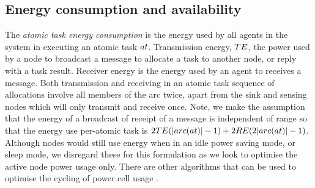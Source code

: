 \subsection{Energy consumption and availability}
The \textit{atomic task energy consumption} is the energy used by all agents in the system in executing an atomic task $\varAtomicTask{}{}$. Transmission energy, $TE$, the power used by a node to  broadcast a message to allocate a task to another node, or reply with a task result. Receiver energy is the energy used by an agent to receives a message. Both transmission and receiving in an atomic task sequence of allocations involve all members of the arc twice, apart from the sink and sensing nodes which will only transmit and receive once. Note, we make the assumption that the energy of a broadcast of receipt of a message is independent of range so that the energy use per-atomic task is 
$2\varTransmissionEnergy{}{} (\funcSize{\functionTaskArc{}{}}{} - 1)
	+ 2\varReceiverEnergy{}{} (2 \funcSize{\functionTaskArc{}{}}{} - 1)
$. Although nodes would still use energy when in an idle power saving mode, or sleep mode, we disregard these for this formulation as we look to optimise the active node power usage only. There are other algorithms that can be used to optimise the cycling of power cell usage \cite{DUMMY}.

\newcommand{\formalAgentEnergyAvailable}[2]{
	\functionFormal{fae}
	{\setAgents{}{}}
	{\setRealNumbersUnit{}{}}
}
\newcommand{\functionAgentEnergyAvailable}[2]{
	\functionSignature{fae_{\varTime{}{}}}
	{\varAgent{}{}}
}
\newcommand{\functionEnergyVariability}[2]{
	\ifx \\#1\\
	\functionSignature{rev_{\varTime{}{}}}
	{\setAgents{}{}}
	\else
	\functionSignature{rev_{\varTime{}{}}}{#1}
	\fi
}

